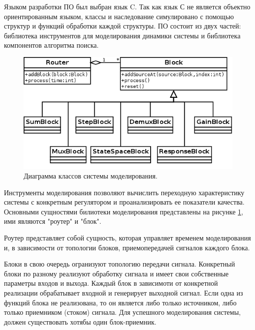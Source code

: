 \documentclass[russian,utf8,emptystyle,12pt]{eskdtext}
\begin{document}
	    Языком разработки ПО был выбран язык C. Так как язык С не является объектно ориентированным языком, классы и наследование симулировано с помощью структур и функций обработки каждой структуры. ПО состоит из двух частей: библиотека инструментов для моделирования динамики системы и библиотека компонентов алгоритма поиска.
	    
        \begin{figure}
            \centering
            \includegraphics[scale=0.5]{simulating-classes.png}
            \caption{Диаграмма классов системы моделирования.}
            \label{fig:simulating-classes}
        \end{figure}	 
	    
	    Инструменты моделирования позволяют вычислить переходную характеристику системы с конкретным регулятором и проанализировать ее показатели качества. Основными сущностями билиотеки моделирования представлены на рисунке \ref{fig:simulating-classes}, ими являются "роутер" и "блок".
	    
	    Роутер представляет собой сущность, которая управляет временем моделирования и, в зависимости от топологии блоков, приемопередачей сигналов каждого блока.
	    
	    Блоки в свою очередь огранизуют топологию передачи сигнала. Конкретный блоки по разному реализуют обработку сигнала и имеет свои собственные параметры входов и выхода. Каждый блок в зависимоти от конкретной реализации обрабатывает входной и генерирует выходной сигнал. Если одна из функций блока не реализована, то он является либо только источником, либо только приемником (стоком) сигнала. Для успешного моделирования системы, должен существовать хотябы один блок-приемник.
        
\end{document}
